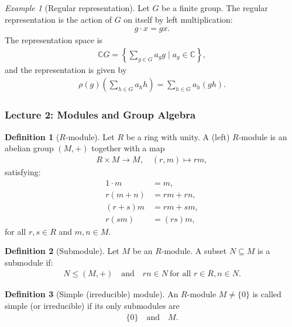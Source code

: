 \documentclass[titlepage]{article}
\theoremstyle{plain}
\theoremstyle{definition}
\newtheorem{definition}{Definition}[section]
\theoremstyle{remark}
\newtheorem{example}[remark]{Example}
\theoremstyle{exercise-style}
\numberwithin{equation}{section}
\numberwithin{theorem}{section}
\numberwithin{remark}{section}
\begin{document}
\begin{example}[Regular representation]
    Let $G$ be a finite group. The regular representation is the action of $G$ on itself by left multiplication:
    \begin{align}
        g \cdot x = gx.
    \end{align}
    The representation space is
    \begin{align}
        \mathbb{C}G = \left\{ \sum_{g \in G} a_g g \mid a_g \in \mathbb{C} \right\},
    \end{align}
    and the representation is given by
    \begin{align}
        \rho(g)\left( \sum_{h \in G} a_h h \right) = \sum_{h \in G} a_h (gh).
    \end{align}
\end{example}

\subsubsection{Lecture 2: Modules and Group Algebra}


\begin{definition}[$R$-module]
Let $R$ be a ring with unity. A (left) $R$-module is an abelian group $(M,+)$ together with a map
\begin{align}
R \times M \to M, \quad (r,m) \mapsto rm,
\end{align}
satisfying:
\begin{align}
1 \cdot m &= m, \\
r(m+n) &= rm + rn, \\
(r+s)m &= rm + sm, \\
r(sm) &= (rs)m,
\end{align}
for all $r,s \in R$ and $m,n \in M$.
\end{definition}

\begin{definition}[Submodule]
Let $M$ be an $R$-module. A subset $N \subseteq M$ is a submodule if:
\begin{align}
N \leq (M,+) \quad \text{and} \quad rn \in N \ \text{for all } r \in R, n \in N.
\end{align}
\end{definition}

\begin{definition}[Simple (irreducible) module]
An $R$-module $M \neq \{0\}$ is called simple (or irreducible) if its only submodules are
\begin{align}
\{0\} \quad \text{and} \quad M.
\end{align}
\end{definition}
\end{document}
